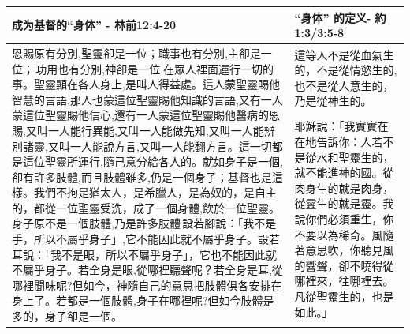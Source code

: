 \begin{table}[H]
  \centering
  \begin{tabular}{p{36em}|p{13em}}  \toprule
成为基督的“身体” - 林前12:4-20 & “身体” 的定义-  約 1:3/3:5-8 \\  \midrule
 \multirow{2}{36.2em}{恩賜原有分別,聖靈卻是一位；職事也有分別,主卻是一位； 功用也有分別,神卻是一位,在眾人裡面運行一切的事。聖靈顯在各人身上,是叫人得益處。這人蒙聖靈賜他智慧的言語,那人也蒙這位聖靈賜他知識的言語,又有一人蒙這位聖靈賜他信心,還有一人蒙這位聖靈賜他醫病的恩賜,又叫一人能行異能,又叫一人能做先知,又叫一人能辨別諸靈,又叫一人能說方言,又叫一人能翻方言。這一切都是這位聖靈所運行,隨己意分給各人的。就如身子是一個,卻有許多肢體,而且肢體雖多,仍是一個身子；基督也是這樣。我們不拘是猶太人，是希臘人，是為奴的，是自主的，都從一位聖靈受洗，成了一個身體,飲於一位聖靈。身子原不是一個肢體,乃是許多肢體 設若腳說：「我不是手，所以不屬乎身子」,它不能因此就不屬乎身子。設若耳說：「我不是眼，所以不屬乎身子」，它也不能因此就不屬乎身子。若全身是眼,從哪裡聽聲呢？若全身是耳,從哪裡聞味呢?但如今，神隨自己的意思把肢體俱各安排在身上了。若都是一個肢體,身子在哪裡呢?但如今肢體是多的，身子卻是一個。}& 這等人不是從血氣生的，不是從情慾生的,也不是從人意生的，乃是從神生的。\\\cline{2-2}
&耶穌說：「我實實在在地告訴你：人若不是從水和聖靈生的，就不能進神的國。從肉身生的就是肉身，從靈生的就是靈。我說你們必須重生，你不要以為稀奇。風隨著意思吹，你聽見風的響聲，卻不曉得從哪裡來，往哪裡去。凡從聖靈生的，也是如此。」\\ \bottomrule
\end{tabular}
\end{table}


